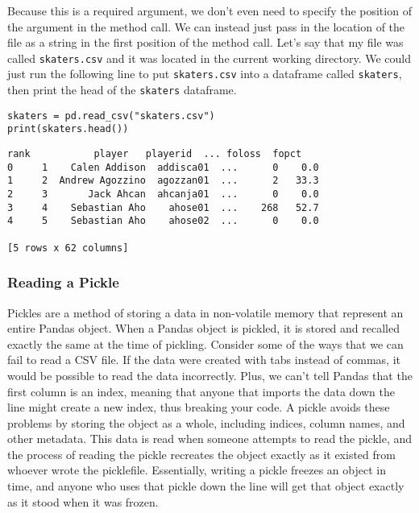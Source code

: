 Because this is a required argument, we don't even need to specify the position of the argument in the method call. We can instead just pass in the location of the file as a string in the first position of the method call. Let's say that my file was called \verb|skaters.csv| and it was located in the current working directory. We could just run the following line to put \verb|skaters.csv| into a dataframe called \verb|skaters|, then print the head of the \verb|skaters| dataframe.\par
\begin{lstlisting}[style=pippython]
skaters = pd.read_csv("skaters.csv")
print(skaters.head())
\end{lstlisting}
\begin{lstlisting}[style=none]
   rank           player   playerid  ... foloss  fopct
0     1    Calen Addison  addisca01  ...      0    0.0
1     2  Andrew Agozzino  agozzan01  ...      2   33.3
2     3       Jack Ahcan  ahcanja01  ...      0    0.0
3     4    Sebastian Aho    ahose01  ...    268   52.7
4     5    Sebastian Aho    ahose02  ...      0    0.0

[5 rows x 62 columns]
\end{lstlisting}
\subsubsection{Reading a Pickle}
Pickles are a method of storing a data in non-volatile memory that represent an entire Pandas object. When a Pandas object is pickled, it is stored and recalled exactly the same at the time of pickling. Consider some of the ways that we can fail to read a CSV file. If the data were created with tabs instead of commas, it would be possible to read the data incorrectly. Plus, we can't tell Pandas that the first column is an index, meaning that anyone that imports the data down the line might create a new index, thus breaking your code. A pickle avoids these problems by storing the object as a whole, including indices, column names, and other metadata. This data is read when someone attempts to read the pickle, and the process of reading the pickle recreates the object exactly as it existed from whoever wrote the picklefile.
Essentially, writing a pickle freezes an object in time, and anyone who uses that pickle down the line will get that object exactly as it stood when it was frozen.
